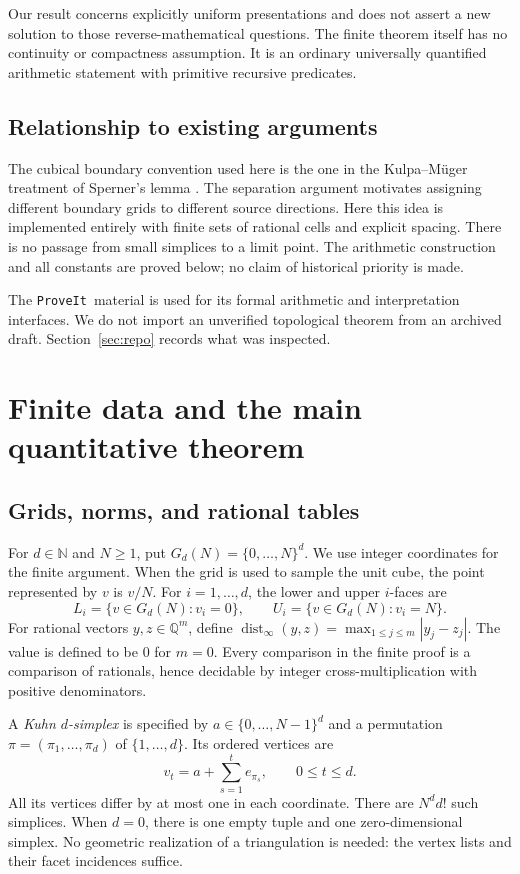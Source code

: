 \documentclass[11pt,a4paper]{article}
\theoremstyle{definition}
\newcommand{\N}{\mathbb N}\newcommand{\Z}{\mathbb Z}
\newcommand{\Q}{\mathbb Q}\newcommand{\R}{\mathbb R}
\newcommand{\dist}{\operatorname{dist}_{\infty}}
\newcommand{\repo}{\texttt{ProveIt}}
\begin{document}
Our result concerns explicitly uniform presentations and does not
assert a new solution to those reverse-mathematical questions. The
finite theorem itself has no continuity or compactness assumption.
It is an ordinary universally quantified arithmetic statement with
primitive recursive predicates.

\subsection{Relationship to existing arguments}
The cubical boundary convention used here is the one in the
Kulpa--M\"uger treatment of Sperner's lemma
\cite[Section 2]{muger}. The separation argument motivates assigning
different boundary grids to different source directions. Here this
idea is implemented entirely with finite sets of rational cells and
explicit spacing. There is no passage from small simplices to a limit
point. The arithmetic construction and all constants are proved below;
no claim of historical priority is made.

The \repo\ material is used for its formal arithmetic and interpretation
interfaces. We do not import an unverified topological theorem from
an archived draft. Section~\ref{sec:repo} records what was inspected.

\section{Finite data and the main quantitative theorem}
\subsection{Grids, norms, and rational tables}
For $d\in\N$ and $N\geq1$, put
$G_d(N)=\{0,\ldots,N\}^{d}$.
We use integer coordinates for the finite argument. When the grid is
used to sample the unit cube, the point represented by $v$ is $v/N$.
For $i=1,\ldots,d$, the lower and upper $i$-faces are
\[
 L_i=\{v\in G_d(N):v_i=0\},\qquad
 U_i=\{v\in G_d(N):v_i=N\}.
\]
For rational vectors $y,z\in\Q^m$, define
$\dist(y,z)=\max_{1\leq j\leq m}|y_j-z_j|$.
The value is defined to be $0$ for $m=0$. Every comparison in the
finite proof is a comparison of rationals, hence decidable by integer
cross-multiplication with positive denominators.

A \emph{Kuhn $d$-simplex} is specified by
$a\in\{0,\ldots,N-1\}^{d}$ and a permutation
$\pi=(\pi_1,\ldots,\pi_d)$ of $\{1,\ldots,d\}$. Its ordered vertices are
\begin{equation}\label{eq:kuhn}
 v_t=a+\sum_{s=1}^{t}e_{\pi_s},\qquad 0\leq t\leq d.
\end{equation}
All its vertices differ by at most one in each coordinate. There are
$N^d d!$ such simplices. When $d=0$, there is one empty tuple and one
zero-dimensional simplex. No geometric realization of a triangulation
is needed: the vertex lists and their facet incidences suffice.
\end{document}
